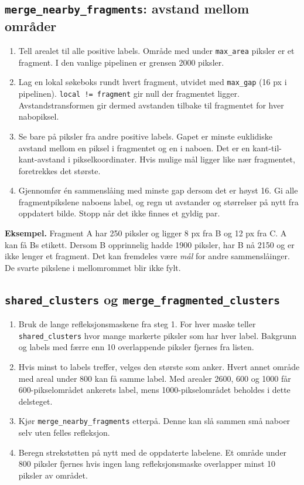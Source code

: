 \documentclass[11pt,a4paper]{article}
\newcommand{\code}[1]{\texttt{#1}}
\begin{document}
\subsection*{\texttt{merge\_nearby\_fragments}: avstand mellom områder}
\begin{enumerate}
\item Tell arealet til alle positive labels. Område med under \code{max\_area} piksler er et fragment. I den vanlige pipelinen er grensen 2000 piksler.
\item Lag en lokal søkeboks rundt hvert fragment, utvidet med \code{max\_gap} (16 px i pipelinen). \code{local != fragment} gir null der fragmentet ligger. Avstandstransformen gir dermed avstanden tilbake til fragmentet for hver nabopiksel.
\item Se bare på piksler fra andre positive labels. Gapet er minste euklidiske avstand mellom en piksel i fragmentet og en i naboen. Det er en kant-til-kant-avstand i pikselkoordinater. Hvis mulige mål ligger like nær fragmentet, foretrekkes det største.
\item Gjennomfør én sammenslåing med minste gap dersom det er høyst 16. Gi alle fragmentpikslene naboens label, og regn ut avstander og størrelser på nytt fra oppdatert bilde. Stopp når det ikke finnes et gyldig par.
\end{enumerate}

\textbf{Eksempel.} Fragment A har 250 piksler og ligger 8 px fra B og 12 px fra C. A kan få Bs etikett. Dersom B opprinnelig hadde 1900 piksler, har B nå 2150 og er ikke lenger et fragment. Det kan fremdeles være \emph{mål} for andre sammenslåinger. De svarte pikslene i mellomrommet blir ikke fylt.

\subsection*{\texttt{shared\_clusters} og \texttt{merge\_fragmented\_clusters}}
\begin{enumerate}
\item Bruk de lange refleksjonsmaskene fra steg 1. For hver maske teller \code{shared\_clusters} hvor mange markerte piksler som har hver label. Bakgrunn og labels med færre enn 10 overlappende piksler fjernes fra listen.
\item Hvis minst to labels treffer, velges den største som anker. Hvert annet område med areal under 800 kan få samme label. Med arealer 2600, 600 og 1000 får 600-pikselområdet ankerets label, mens 1000-pikselområdet beholdes i dette delsteget.
\item Kjør \code{merge\_nearby\_fragments} etterpå. Denne kan slå sammen små naboer selv uten felles refleksjon.
\item Beregn strekstøtten på nytt med de oppdaterte labelene. Et område under 800 piksler fjernes hvis ingen lang refleksjonsmaske overlapper minst 10 piksler av området.
\end{enumerate}
\end{document}
